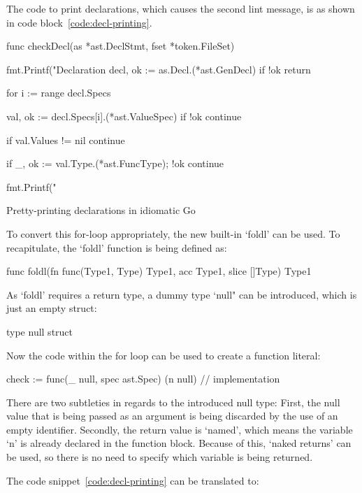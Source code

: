 The code to print declarations, which causes the second lint message, is as shown in code block~\ref{code:decl-printing}.

\begin{code}
\begin{gocode}
func checkDecl(as *ast.DeclStmt, fset *token.FileSet) {
	fmt.Printf("Declaration %
	decl, ok := as.Decl.(*ast.GenDecl)
	if !ok {
		return
	}

	for i := range decl.Specs {
		val, ok := decl.Specs[i].(*ast.ValueSpec)
		if !ok {
			continue
		}

		if val.Values != nil {
			continue
		}

		if _, ok := val.Type.(*ast.FuncType); !ok {
			continue
		}

		fmt.Printf("\tIdent %
	}
}
\end{gocode}
	\caption{Pretty-printing declarations in idiomatic Go\label{code:decl-printing}}
\end{code}
To convert this for-loop appropriately, the new built-in `foldl' can be used.
To recapitulate, the `foldl' function is being defined as:
\begin{gocode}
func foldl(fn func(Type1, Type) Type1, acc Type1, slice []Type) Type1
\end{gocode}
As `foldl' requires a return type, a dummy type `null" can be introduced, which
is just an empty struct:
\begin{gocode}
type null struct{}
\end{gocode}
Now the code within the for loop can be used to create a function literal:
\begin{gocode}
check := func(_ null, spec ast.Spec) (n null) {
	// implementation
}
\end{gocode}
There are two subtleties in regards to the introduced null type:
First, the null value that is being passed as an argument is being discarded
by the use of an empty identifier.
Secondly, the return value is `named', which means the variable `n' is
already declared in the function block. Because of this, `naked returns' can
be used, so there is no need to specify which variable is being returned.

The code snippet~\ref{code:decl-printing} can be translated to:

